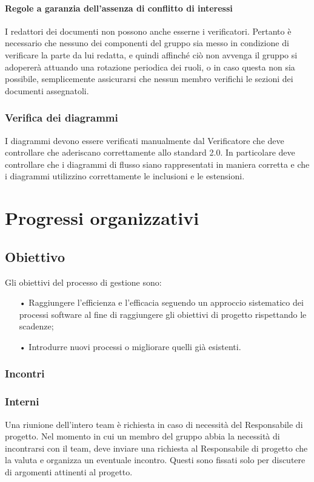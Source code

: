 \paragraph{Regole a garanzia dell'assenza di conflitto di interessi} I redattori dei documenti non possono anche esserne i verificatori. Pertanto è necessario che nessuno dei componenti del gruppo sia messo in condizione di verificare la parte da lui redatta, e quindi affinché ciò non avvenga il gruppo si adopererà attuando una rotazione periodica dei ruoli, o in caso questa non sia possibile, semplicemente assicurarsi che nessun membro verifichi le sezioni dei documenti assegnatoli.
\subsubsection{Verifica dei diagrammi}
I diagrammi devono essere verificati manualmente dal Verificatore che deve controllare che aderiscano correttamente allo standard 2.0. In particolare deve controllare che i diagrammi di flusso siano rappresentati in maniera corretta e che i diagrammi utilizzino correttamente le inclusioni e le estensioni.

\section{Progressi organizzativi}

\subsection{Obiettivo}
Gli obiettivi del processo di gestione sono:
\begin{itemize}
\item[•] Raggiungere l’efficienza e l’efficacia seguendo un approccio sistematico dei processi software al fine di raggiungere gli obiettivi di progetto rispettando le scadenze;
\item[•] Introdurre nuovi processi o migliorare quelli già esistenti.
\end{itemize}

\subsubsection{Incontri}

\subsubsection{Interni}
Una riunione dell'intero team è richiesta in caso di necessità del Responsabile di progetto. Nel momento in cui un membro del gruppo abbia la necessità di incontrarsi con il team, deve inviare una richiesta al Responsabile di progetto che la valuta e organizza un eventuale incontro. Questi sono fissati solo per discutere di argomenti attinenti al progetto.

